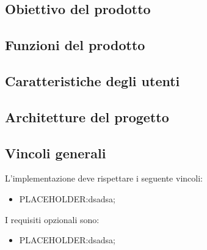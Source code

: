 \documentclass[../analisi-dei-requisiti.tex]{subfiles}
\begin{document}
\subsection{Obiettivo del prodotto}
\label{subs:obiettivo_del_prodotto}


\subsection{Funzioni del prodotto}
\label{subs:funzioni_del_prodotto}



\subsection{Caratteristiche degli utenti}
\label{subs:caratteristiche_degli_utenti}


\subsection{Architetture del progetto}
\label{subs:architetture_e_tecnologie_del_progetto}

\subsection{Vincoli generali}
\label{subs:vincoli_generali}
L'implementazione deve rispettare i seguente vincoli:
\begin{itemize}
    \item{PLACEHOLDER}:dsadsa;
\end{itemize}


\setlength{\parindent}{0pt}I requisiti opzionali sono:
\begin{itemize}
    \item{PLACEHOLDER}:dsadsa;
\end{itemize}
\end{document}
